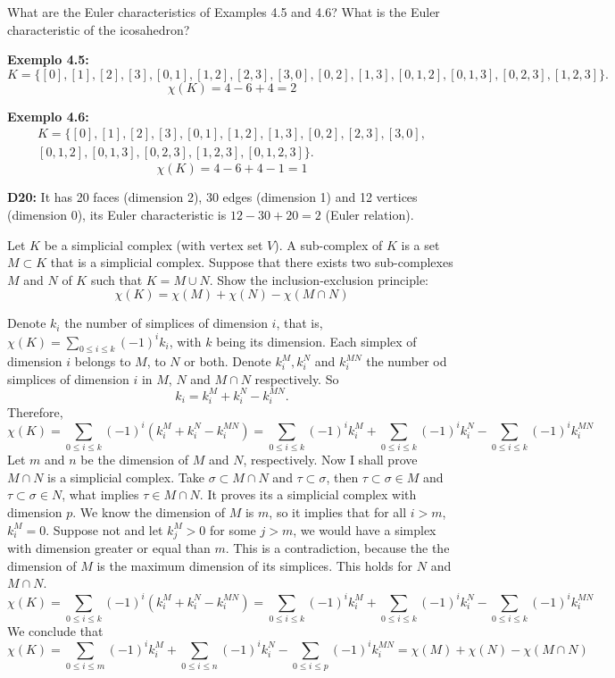 \begin{exercise}
    What are the Euler characteristics of Examples 4.5 and 4.6? What is the Euler characteristic of the icosahedron?
\end{exercise}

\textbf{Exemplo 4.5:} 
$$K = \{[0], [1], [2], [3], [0, 1], [1, 2], [2, 3], [3, 0], [0, 2], [1, 3], [0, 1, 2], [0, 1, 3], [0, 2, 3], [1, 2, 3]\}.$$
$$
\chi (K) = 4 - 6 + 4 = 2
$$

\textbf{Exemplo 4.6:}
\begin{multline*}
    K = \{[0], [1],[2], [3], [0, 1], [1, 2], [1,3], [0,2] ,[2, 3], [3, 0], \\
    [0, 1, 2], [0, 1, 3], [0, 2, 3], [1, 2, 3], [0, 1, 2, 3]\}.    
\end{multline*}
$$
\chi (K) = 4 - 6 + 4 - 1 = 1
$$

\textbf{D20:} It has 20 faces (dimension 2), 30 edges (dimension 1) and 12
vertices (dimension 0), its Euler characteristic is $12 - 30 + 20 = 2$ (Euler
relation). 

\noindent\linia

\begin{exercise}
    Let $K$ be a simplicial complex (with vertex set $V$). A sub-complex of
    $K$ is a set $M \subset K$ that is a simplicial complex. Suppose that
    there exists two sub-complexes $M$ and $N$ of $K$ such that $K = M \cup
    N$. Show the inclusion-exclusion principle:
    $$
    \chi(K) = \chi(M) + \chi(N) - \chi(M \cap N)
    $$
\end{exercise}

Denote $k_i$ the number of simplices of dimension $i$, that is, $\chi (K) =
\sum_{0 \le i \le k} (-1)^i k_i$, with $k$ being its dimension. Each simplex of dimension $i$ belongs to
$M$, to $N$ or both. Denote $k_i^M, k_i^N$ and $k_i^{MN}$ the number od
simplices of dimension $i$ in $M$, $N$ and $M \cap N$ respectively. So
$$k_i = k_i^M + k_i^N - k_i^{MN}.$$
Therefore, 
$$
\chi(K) = \sum_{0 \le i \le k} (-1)^i (k_i^M + k_i^N - k_i^{MN}) = \sum_{0 \le i \le k}(-1)^i k_i^M + \sum_{0 \le i \le k}(-1)^i k_i^N - \sum_{0 \le i \le k}(-1)^i k_i^{MN} 
$$
Let $m$ and $n$ be the dimension of $M$ and $N$,
respectively. Now I shall prove $M \cap N$ is a simplicial complex. Take
$\sigma \subset M \cap N$ and $\tau \subset \sigma$, then $\tau \subset \sigma
\in M$ and $\tau \subset \sigma \in N$, what implies $\tau \in M \cap N$. It
proves its a simplicial complex with dimension $p$. We know the dimension of $M$ is
$m$, so it implies that for all $i > m$, $k_i^M = 0$. Suppose not and let $k_j^M > 0$ for
some $j > m$, we would have a simplex with dimension greater or equal than
$m$. This is a contradiction, because the the dimension of $M$ is the maximum
dimension of its simplices. This holds for $N$ and $M \cap N$. 
$$
\chi(K) = \sum_{0 \le i \le k} (-1)^i (k_i^M + k_i^N - k_i^{MN}) = \sum_{0 \le i \le k}(-1)^i k_i^M + \sum_{0 \le i \le k}(-1)^i k_i^N - \sum_{0 \le i \le k}(-1)^i k_i^{MN} 
$$
We conclude that 
$$
\chi(K) = \sum_{0 \le i \le m}(-1)^i k_i^M + \sum_{0 \le i \le n}(-1)^i k_i^N - \sum_{0 \le i \le p}(-1)^i k_i^{MN} = \chi(M) + \chi(N) - \chi(M \cap N)
$$

